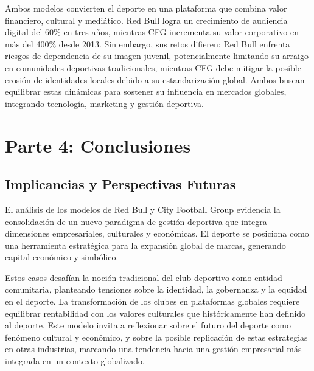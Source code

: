 \documentclass[12pt,a4paper]{article}
\begin{document}
Ambos modelos convierten el deporte en una plataforma que combina valor financiero, cultural y mediático. Red Bull logra un crecimiento de audiencia digital del 60\% en tres años, mientras CFG incrementa su valor corporativo en más del 400\% desde 2013. Sin embargo, sus retos difieren: Red Bull enfrenta riesgos de dependencia de su imagen juvenil, potencialmente limitando su arraigo en comunidades deportivas tradicionales, mientras CFG debe mitigar la posible erosión de identidades locales debido a su estandarización global. Ambos buscan equilibrar estas dinámicas para sostener su influencia en mercados globales, integrando tecnología, marketing y gestión deportiva.


\section{Parte 4: Conclusiones}

\subsection{Implicancias y Perspectivas Futuras}

El análisis de los modelos de Red Bull y City Football Group evidencia la consolidación de un nuevo paradigma de gestión deportiva que integra dimensiones empresariales, culturales y económicas. El deporte se posiciona como una herramienta estratégica para la expansión global de marcas, generando capital económico y simbólico. 

Estos casos desafían la noción tradicional del club deportivo como entidad comunitaria, planteando tensiones sobre la identidad, la gobernanza y la equidad en el deporte. La transformación de los clubes en plataformas globales requiere equilibrar rentabilidad con los valores culturales que históricamente han definido al deporte. 
Este modelo invita a reflexionar sobre el futuro del deporte como fenómeno cultural y económico, y sobre la posible replicación de estas estrategias en otras industrias, marcando una tendencia hacia una gestión empresarial más integrada en un contexto globalizado.
\end{document}
